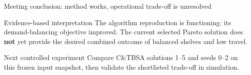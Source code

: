 \documentclass[aspectratio=169,10pt]{beamer}
\begin{document}
\begin{frame}{Meeting conclusion: method works, operational trade-off is unresolved}
  \centering
  \vspace{0.28cm}
  \begin{alertblock}{Evidence-based interpretation}
    \centering\scriptsize The algorithm reproduction is functioning: its demand-balancing
    objective improved. The current selected Pareto solution does \textbf{not}
    yet provide the desired combined outcome of balanced shelves and low travel.
  \end{alertblock}
  \vspace{0.08cm}
  \begin{block}{Next controlled experiment}
    \centering\scriptsize Compare C\&TBSA solutions 1--5 and seeds 0--2 on this frozen
    input snapshot, then validate the shortlisted trade-off in simulation.
  \end{block}
\end{frame}
\end{document}
